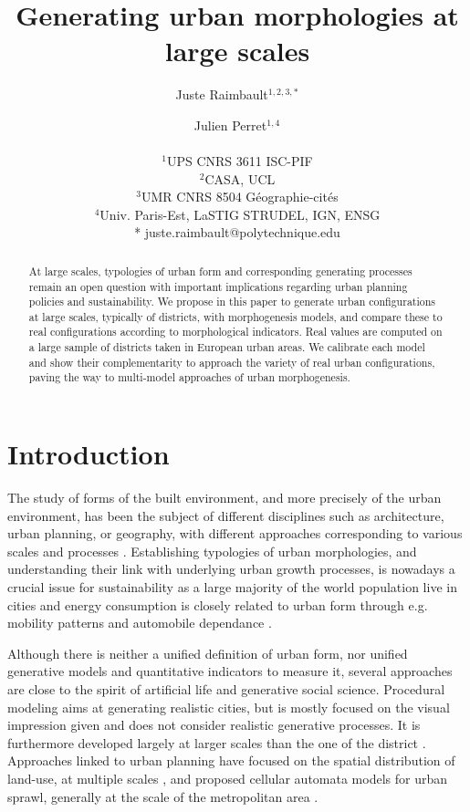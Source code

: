 \documentclass[letterpaper]{article}
\title{Generating urban morphologies at large scales}
\author{Juste Raimbault$^{1,2,3,*}$ \and Julien Perret$^{1,4}$ \\
\mbox{}\\
$^1$UPS CNRS 3611 ISC-PIF\\
$^2$CASA, UCL\\
$^3$UMR CNRS 8504 G{\'e}ographie-cit{\'e}s\\
$^4$Univ. Paris-Est, LaSTIG STRUDEL, IGN, ENSG\\\medskip
* juste.raimbault@polytechnique.edu} %
\begin{document}
\maketitle

\begin{abstract}
  At large scales, typologies of urban form and corresponding generating processes remain an open question with important implications regarding urban planning policies and sustainability.
  We propose in this paper to generate urban configurations at large scales, typically of districts, with morphogenesis models, and compare these to real configurations according to morphological indicators.
  Real values are computed on a large sample of districts taken in European urban areas.
  We calibrate each model and show their complementarity to approach the variety of real urban configurations, paving the way to multi-model approaches of urban morphogenesis.
\end{abstract}


\section{Introduction}


The study of forms of the built environment, and more precisely of the urban environment, has been the subject of different disciplines such as architecture, urban planning, or geography, with different approaches corresponding to various scales and processes \citep{moudon1997urban,gauthier2006mapping,kropf2009aspects}.
Establishing typologies of urban morphologies, and understanding their link with underlying urban growth processes, is nowadays a crucial issue for sustainability as a large majority of the world population live in cities and energy consumption is closely related to urban form through e.g. mobility patterns and automobile dependance \citep{newman2000sustainable}.


Although there is neither a unified definition of urban form, nor unified generative models and quantitative indicators to measure it, several approaches are close to the spirit of artificial life and generative social science.
Procedural modeling \citep{watson2008procedural} aims at generating realistic cities, but is mostly focused on the visual impression given and does not consider realistic generative processes.
It is furthermore developed largely at larger scales than the one of the district \citep{Parish:2001:PMC:383259.383292}.
Approaches linked to urban planning have focused on the spatial distribution of land-use, at multiple scales \citep{liu2017future}, and proposed cellular automata models for urban sprawl, generally at the scale of the metropolitan area \citep{herold2003spatiotemporal}.
\end{document}
